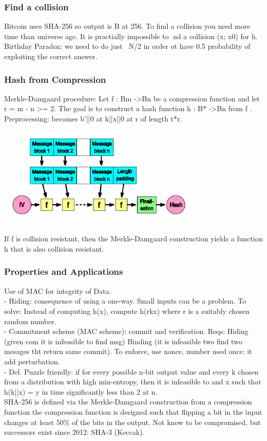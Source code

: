 \documentclass{article}
\begin{document}
\subsubsection{Find a collision}
Bitcoin uses SHA-256 so output is B at 256. To find a collision you need more time than universe age. It is practially impossible to nd a collision (x; x0) for h.\\
Birthday Paradox: we need to do just ~N/2 in order ot have 0.5 probability of exploiting the correct answer.

\subsubsection{Hash from Compression}
Merkle-Damgaard procedure: Let f : Bm -\textgreater Bn be a compression function and let r = m - n \textgreater=  2. The goal is to construct a hash function h : B* -\textgreater Bn from f .\\ Preprocessing: becomes b'||0 at k||x||0 at r of length t*r.\\\\
\includegraphics[scale=0.8]{2.png}\\\\
If f is collision resistant, then the Merkle-Damgaard construction yields a function h that is also collision resistant.\\
\subsubsection{Properties and Applications}
Use of MAC for integrity of Data. \\
- Hiding: consequence of using a one-way. Small inputs can be a problem. To solve: Instead of computing h(x), compute h(rkx) where r is a suitably chosen random number.\\
- Commitment scheme (MAC scheme): commit and verification. Reqs: Hiding (given com it is infeasible to find msg) Binding (it is infeasible two find two mesages tht return same commit). To enforce, use nonce, number used once: it add perturbation.\\
- Def. Puzzle friendly: if for every possible n-bit output value and every k
chosen from a distribution with high min-entropy, then it is infeasible to and x such that h(k||x) = y in time significantly less than 2 at n.\\
SHA-256 is defined via the Merkle-Damgaard construction from a compression function the compression function is designed such that flipping a bit in the input changes at least 50$\%$ of the bits in the output. Not know to be compromised, but successors exist since 2012: SHA-3 (Keccak).
\end{document}
